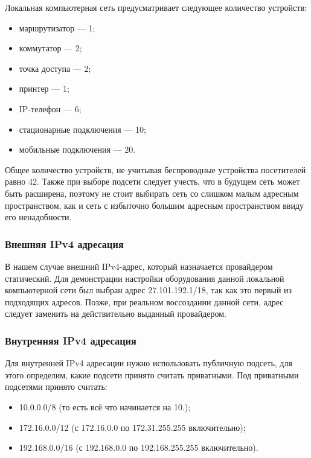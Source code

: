 Локальная компьютерная сеть предусматривает следующее количество устройств:
\begin{itemize}
    \item маршрутизатор — 1;
    \item коммутатор — 2;
    \item точка доступа — 2;
    \item принтер — 1;
    \item IP-телефон — 6;
    \item стационарные подключения — 10;
    \item мобильные подключения — 20.
\end{itemize}

Общее количество устройств, не учитывая беспроводные устройства посетителей равно 42.
Также при выборе подсети следует учесть, что в будущем сеть может быть расширена,
поэтому не стоит выбирать сеть со слишком малым адресным пространством,
как и сеть с избыточно большим адресным пространством ввиду его ненадобности.

    \subsubsection{Внешняя IPv4 адресация}\label{subsubsec:func:OutererV4}
    В нашем случае внешний IPv4-адрес, который назначается провайдером статический.
    Для демонстрации настройки оборудования данной локальной компьютерной сети был выбран адрес 27.101.192.1/18,
    так как это первый из подходящих адресов.
    Позже, при реальном воссоздании данной сети, адрес следует заменить на действительно выданный провайдером.

    \subsubsection{Внутренняя IPv4 адресация}\label{subsubsec:func:InnerV4}
    Для внутренней IPv4 адресации нужно использовать публичную подсеть, для этого определим, какие подсети принято считать приватными.
    Под приватными подсетями принято считать:
    \begin{itemize}
        \item 10.0.0.0/8 (то есть всё что начинается на 10.);
        \item 172.16.0.0/12 (с 172.16.0.0 по 172.31.255.255 включительно);
        \item 192.168.0.0/16 (с 192.168.0.0 по 192.168.255.255 включительно).
    \end{itemize}

